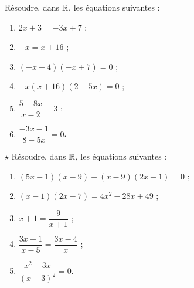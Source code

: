 \documentclass[a4paper,11pt]{article}
\begin{document}
\begin{cexercice}
\vspace{-0.5cm}
\setlength{\columnseprule}{1pt}
\begin{multicols}{2}
	Résoudre, dans $\R$, les équations suivantes :
	\begin{enumerate}
		\item $2x+3=-3x+7$ ;
		\item $-x=x+16$ ;
		\item $(-x-4)(-x+7)=0$ ;
		\item $-x(x+16)(2-5x)=0$ ;
		\item $\dfrac{5-8x}{x-2}=3$ ;
		\item $\dfrac{-3x-1}{8-5x}=0$.
	\end{enumerate}
	$\star$ Résoudre, dans $\R$, les équations suivantes :
	\begin{enumerate}
		\item $(5x-1)(x-9)-(x-9)(2x-1)=0$ ;
		\item $(x-1)(2x-7)=4x^2-28x+49$ ;
		\item $x+1 = \dfrac{9}{x+1}$ ;
		\item $\dfrac{3x-1}{x-5} = \dfrac{3x-4}{x}$ ;
		\item $\dfrac{x^2-3x}{(x-3)^2}=0$.
	\end{enumerate}
\end{multicols}
\smallskip
\end{cexercice}
\end{document}
